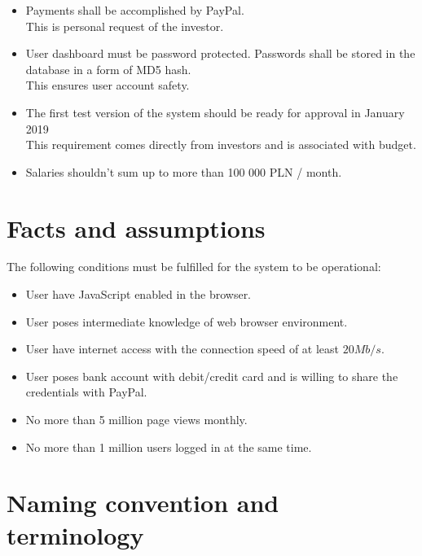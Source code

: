 \documentclass{scrreprt}
\begin{document}
\begin{itemize}
\item Payments shall be accomplished by PayPal.
\\This is personal request of the investor.

\item User dashboard must be password protected. Passwords shall be stored in the database in a form of MD5 hash.
\\This ensures user account safety.

\item The first test version of the system should be ready for approval in January 2019
\\This requirement comes directly from investors and is associated with budget.

\item Salaries shouldn't sum up to more than 100 000 PLN / month.

\end{itemize}

\section{Facts and assumptions}

The following conditions must be fulfilled for the system to be operational:
\begin{itemize}
\item User have JavaScript enabled in the browser.
\item User poses intermediate knowledge of web browser environment.
\item User have internet access with the connection speed of at least $20Mb/s$.
\item User poses bank account with debit/credit card and is willing to share the credentials with PayPal.
\item No more than 5 million page views monthly.
\item No more than 1 million users logged in at the same time.
\end{itemize}

\section{Naming convention and terminology}
\label{comp-skills}
\end{document}
